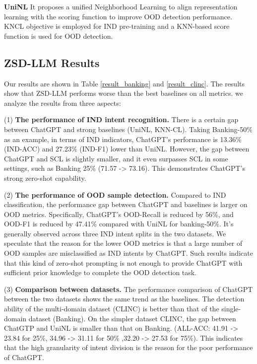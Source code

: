 \documentclass[10pt, a4paper]{article}
\begin{document}
\textbf{UniNL} \cite{Mou2022UniNLAR} It proposes a unified Neighborhood Learning to align representation learning with the scoring function to improve OOD detection performance. KNCL objective is employed for IND pre-training and a KNN-based score function is used for OOD detection. 

\subsection{ZSD-LLM Results}
\label{sec:main_result}

Our results are shown in Table \ref{result_banking} and \ref{result_clinc}. The results show that ZSD-LLM performs worse than the best baselines on all metrics. we analyze the results from three aspects:

(1) \textbf{The performance of IND intent recognition.} There is a certain gap between ChatGPT and strong baselines (UniNL, KNN-CL). Taking Banking-50\% as an example, in terms of IND indicators, ChatGPT's performance is 13.36\% (IND-ACC) and 27.23\% (IND-F1) lower than UniNL. However, the gap between ChatGPT and SCL is slightly smaller, and it even surpasses SCL in some settings, such as Banking 25\% (71.57 -> 73.16). This demonstrates ChatGPT's strong zero-shot capability.

(2) \textbf{The performance of OOD sample detection.} Compared to IND classification, the performance gap between ChatGPT and baselines is larger on OOD metrics. Specifically, ChatGPT's OOD-Recall is reduced by 56\%, and OOD-F1 is reduced by 47.41\% compared with UniNL for banking-50\%. It's generally observed across three IND intent splits in the two datasets. We speculate that the reason for the lower OOD metrics is that a large number of OOD samples are misclassified as IND intents by ChatGPT. Such results indicate that this kind of zero-shot prompting is not enough to provide ChatGPT with sufficient prior knowledge to complete the OOD detection task.

(3) \textbf{Comparison between datasets.} The performance comparison of ChatGPT between the two datasets shows the same trend as the baselines. The detection ability of the multi-domain dataset (CLINC) is better than that of the single-domain dataset (Banking). On the simpler dataset CLINC, the gap between ChatGTP and UniNL is smaller than that on Banking. (ALL-ACC: 41.91 -> 23.84 for 25\%, 34.96 -> 31.11 for 50\% ,32.20 -> 27.53 for 75\%). This indicates that the high granularity of intent division is the reason for the poor performance of ChatGPT.
\end{document}
